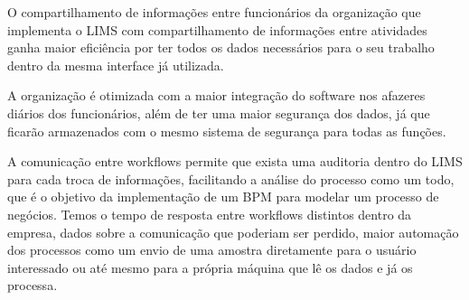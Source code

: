O compartilhamento de informações entre funcionários da organização que implementa o LIMS com compartilhamento de informações entre atividades ganha maior eficiência por ter todos os dados necessários para o seu trabalho dentro da mesma interface já utilizada.

A organização é otimizada com a maior integração do software nos afazeres diários dos funcionários, além de ter uma maior segurança dos dados, já que ficarão armazenados com o mesmo sistema de segurança para todas as funções.


A comunicação entre workflows permite que exista uma auditoria dentro do LIMS para cada troca de informações, facilitando a análise do processo como um todo, que é o objetivo da implementação de um BPM para modelar um processo de negócios. Temos o tempo de resposta entre workflows distintos dentro da empresa, dados sobre a comunicação que poderiam ser perdido, maior automação dos processos como um envio de uma amostra diretamente para o usuário interessado ou até mesmo para a própria máquina que lê os dados e já os processa.